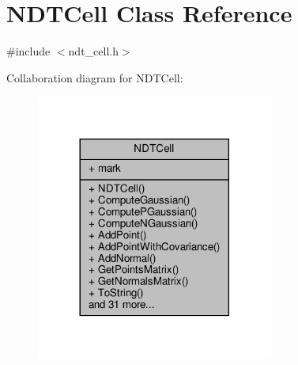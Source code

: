 \hypertarget{classNDTCell}{}\section{N\+D\+T\+Cell Class Reference}
\label{classNDTCell}


{\ttfamily \#include $<$ndt\+\_\+cell.\+h$>$}



Collaboration diagram for N\+D\+T\+Cell\+:\nopagebreak
\begin{figure}[H]
\begin{center}
\leavevmode
\includegraphics[width=221pt]{db/d0b/classNDTCell__coll__graph}
\end{center}
\end{figure}
